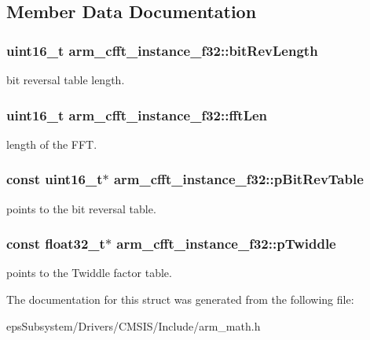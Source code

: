 \subsection{Member Data Documentation}
\hypertarget{structarm__cfft__instance__f32_a3ba329ed153d182746376208e773d648}{
\subsubsection[{bit\-Rev\-Length}]{\setlength{\rightskip}{0pt plus 5cm}uint16\-\_\-t arm\-\_\-cfft\-\_\-instance\-\_\-f32\-::bit\-Rev\-Length}}\label{structarm__cfft__instance__f32_a3ba329ed153d182746376208e773d648}
bit reversal table length. \hypertarget{structarm__cfft__instance__f32_acd8f9e9540e3dd348212726e5d6aaa95}{
\subsubsection[{fft\-Len}]{\setlength{\rightskip}{0pt plus 5cm}uint16\-\_\-t arm\-\_\-cfft\-\_\-instance\-\_\-f32\-::fft\-Len}}\label{structarm__cfft__instance__f32_acd8f9e9540e3dd348212726e5d6aaa95}
length of the F\-F\-T. \hypertarget{structarm__cfft__instance__f32_a21ceaf59a1bb8440af57c28d2dd9bbab}{
\subsubsection[{p\-Bit\-Rev\-Table}]{\setlength{\rightskip}{0pt plus 5cm}const uint16\-\_\-t$\ast$ arm\-\_\-cfft\-\_\-instance\-\_\-f32\-::p\-Bit\-Rev\-Table}}\label{structarm__cfft__instance__f32_a21ceaf59a1bb8440af57c28d2dd9bbab}
points to the bit reversal table. \hypertarget{structarm__cfft__instance__f32_a59cc6f753f1498716e1444ac054c06de}{
\subsubsection[{p\-Twiddle}]{\setlength{\rightskip}{0pt plus 5cm}const float32\-\_\-t$\ast$ arm\-\_\-cfft\-\_\-instance\-\_\-f32\-::p\-Twiddle}}\label{structarm__cfft__instance__f32_a59cc6f753f1498716e1444ac054c06de}
points to the Twiddle factor table. 

The documentation for this struct was generated from the following file\-:\begin{DoxyCompactItemize}
\item 
eps\-Subsystem/\-Drivers/\-C\-M\-S\-I\-S/\-Include/arm\-\_\-math.\-h\end{DoxyCompactItemize}
